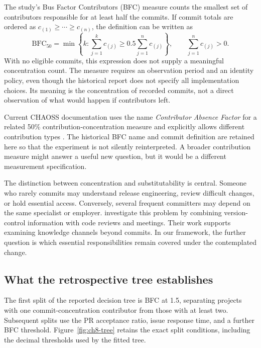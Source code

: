 

The study's Bus Factor Contributors (BFC) measure counts the smallest set of contributors responsible for at least half the commits. If commit totals are ordered as \(c_{(1)}\geq\cdots\geq c_{(n)}\), the definition can be written as
\begin{equation}
\mathrm{BFC}_{50}=\min\left\{k:\sum_{j=1}^{k}c_{(j)}\geq
0.5\sum_{j=1}^{n}c_{(j)}\right\},\qquad \sum_{j=1}^{n}c_{(j)}>0.
\label{eq:ch8-bfc}
\end{equation}
With no eligible commits, this expression does not supply a meaningful concentration count. The measure requires an observation period and an identity policy, even though the historical report does not specify all implementation choices. Its meaning is the concentration of recorded commits, not a direct observation of what would happen if contributors left.

Current CHAOSS documentation uses the name \emph{Contributor Absence Factor} for a related 50\% contribution-concentration measure and explicitly allows different contribution types \citep{chaossabsence}. The historical BFC name and commit definition are retained here so that the experiment is not silently reinterpreted. A broader contribution measure might answer a useful new question, but it would be a different measurement specification.

The distinction between concentration and substitutability is central. Someone who rarely commits may understand release engineering, review difficult changes, or hold essential access. Conversely, several frequent committers may depend on the same specialist or employer. \citet{jabrayilzade2022} investigate this problem by combining version-control information with code reviews and meetings. Their work supports examining knowledge channels beyond commits. In our framework, the further question is which essential responsibilities remain covered under the contemplated change.

\subsection{What the retrospective tree establishes}
The first split of the reported decision tree is BFC at 1.5, separating projects with one commit-concentration contributor from those with at least two. Subsequent splits use the PR acceptance ratio, issue response time, and a further BFC threshold. Figure~\ref{fig:ch8-tree} retains the exact split conditions, including the decimal thresholds used by the fitted tree.

